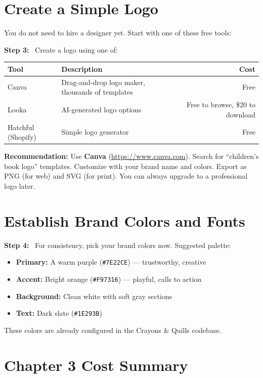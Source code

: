 \documentclass[12pt, letterpaper, oneside]{book}
\newcommand{\step}[1]{\noindent\textbf{\textcolor{primary}{Step #1:}}~}
\begin{document}
\section{Create a Simple Logo}

You do not need to hire a designer yet. Start with one of these free tools:

\step{3} Create a logo using one of:
\begin{table}[H]
\centering
\begin{tabularx}{\textwidth}{lXr}
\toprule
\textbf{Tool} & \textbf{Description} & \textbf{Cost} \\
\midrule
Canva & Drag-and-drop logo maker, thousands of templates & Free \\
Looka & AI-generated logo options & Free to browse, \$20 to download \\
Hatchful (Shopify) & Simple logo generator & Free \\
\bottomrule
\end{tabularx}
\end{table}

\begin{infobox}
\textbf{Recommendation:} Use \textbf{Canva} (\url{https://www.canva.com}). Search for ``children's book logo'' templates. Customize with your brand name and colors. Export as PNG (for web) and SVG (for print). You can always upgrade to a professional logo later.
\end{infobox}

\section{Establish Brand Colors and Fonts}

\step{4} For consistency, pick your brand colors now. Suggested palette:
\begin{itemize}[leftmargin=2em]
  \item \textbf{Primary:} A warm purple (\texttt{\#7E22CE}) --- trustworthy, creative
  \item \textbf{Accent:} Bright orange (\texttt{\#F97316}) --- playful, calls to action
  \item \textbf{Background:} Clean white with soft gray sections
  \item \textbf{Text:} Dark slate (\texttt{\#1E293B})
\end{itemize}

\noindent These colors are already configured in the Crayons \& Quills codebase.

\section{Chapter 3 Cost Summary}
\end{document}
